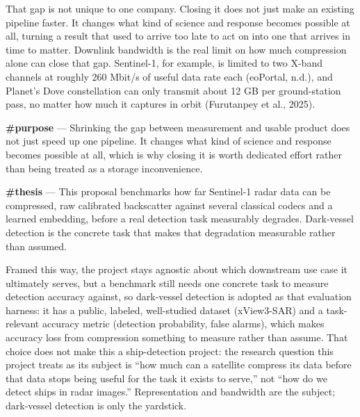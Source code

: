 \documentclass[11pt]{article}
\begin{document}
That gap is not unique to one company. Closing it does not just make an existing pipeline faster. It changes what kind of science and response becomes possible at all, turning a result that used to arrive too late to act on into one that arrives in time to matter. Downlink bandwidth is the real limit on how much compression alone can close that gap. Sentinel-1, for example, is limited to two X-band channels at roughly 260 Mbit/s of useful data rate each (eoPortal, n.d.), and Planet's Dove constellation can only transmit about 12 GB per ground-station pass, no matter how much it captures in orbit (Furutanpey et al., 2025).

\textbf{\#purpose} --- Shrinking the gap between measurement and usable product does not just speed up one pipeline. It changes what kind of science and response becomes possible at all, which is why closing it is worth dedicated effort rather than being treated as a storage inconvenience.

\textbf{\#thesis} --- This proposal benchmarks how far Sentinel-1 radar data can be compressed, raw calibrated backscatter against several classical codecs and a learned embedding, before a real detection task measurably degrades. Dark-vessel detection is the concrete task that makes that degradation measurable rather than assumed.

Framed this way, the project stays agnostic about which downstream use case it ultimately serves, but a benchmark still needs one concrete task to measure detection accuracy against, so dark-vessel detection is adopted as that evaluation harness: it has a public, labeled, well-studied dataset (xView3-SAR) and a task-relevant accuracy metric (detection probability, false alarms), which makes accuracy loss from compression something to measure rather than assume. That choice does not make this a ship-detection project: the research question this project treats as its subject is ``how much can a satellite compress its data before that data stops being useful for the task it exists to serve,'' not ``how do we detect ships in radar images.'' Representation and bandwidth are the subject; dark-vessel detection is only the yardstick.
\end{document}
